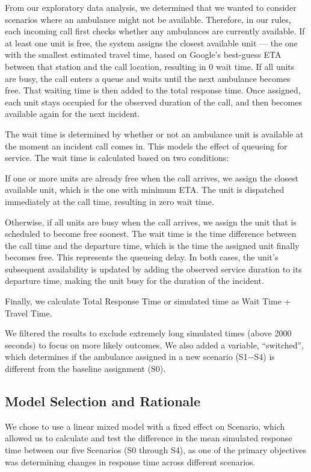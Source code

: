 \documentclass[
  11pt,
]{article}
\begin{document}
From our exploratory data analysis, we determined that we wanted to
consider scenarios where an ambulance might not be available. Therefore,
in our rules, each incoming call first checks whether any ambulances are
currently available. If at least one unit is free, the system assigns
the closest available unit --- the one with the smallest estimated
travel time, based on Google's best-guess ETA between that station and
the call location, resulting in 0 wait time. If all units are busy, the
call enters a queue and waits until the next ambulance becomes free.
That waiting time is then added to the total response time. Once
assigned, each unit stays occupied for the observed duration of the
call, and then becomes available again for the next incident.

The wait time is determined by whether or not an ambulance unit is
available at the moment an incident call comes in. This models the
effect of queueing for service. The wait time is calculated based on two
conditions:

If one or more units are already free when the call arrives, we assign
the closest available unit, which is the one with minimum ETA. The unit
is dispatched immediately at the call time, resulting in zero wait time.

Otherwise, if all units are busy when the call arrives, we assign the
unit that is scheduled to become free soonest. The wait time is the time
difference between the call time and the departure time, which is the
time the assigned unit finally becomes free. This represents the
queueing delay. In both cases, the unit's subsequent availability is
updated by adding the observed service duration to its departure time,
making the unit busy for the duration of the incident.

Finally, we calculate Total Response Time or simulated time as Wait Time
+ Travel Time.

We filtered the results to exclude extremely long simulated times (above
2000 seconds) to focus on more likely outcomes. We also added a
variable, ``switched'', which determines if the ambulance assigned in a
new scenario (S1−S4) is different from the baseline assignment (S0).

\subsection{Model Selection and
Rationale}\label{model-selection-and-rationale}

We chose to use a linear mixed model with a fixed effect on Scenario,
which allowed us to calculate and test the difference in the mean
simulated response time between our five Scenarios (S0 through S4), as
one of the primary objectives was determining changes in response time
across different scenarios.
\end{document}
